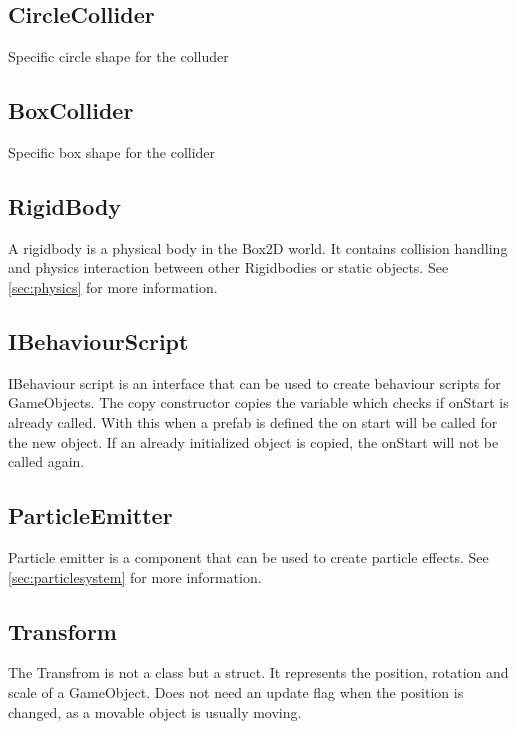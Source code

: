 \subsection{CircleCollider}
Specific circle shape for the colluder
\subsection{BoxCollider}
Specific box shape for the collider

\subsection{RigidBody}
A rigidbody is a physical body in the Box2D world. It contains collision handling and physics interaction between other Rigidbodies or static objects.
See \autoref{sec:physics} for more information.

\subsection{IBehaviourScript}
IBehaviour script is an interface that can be used to create behaviour scripts for GameObjects.
The copy constructor copies the variable which checks if onStart is already called. 
With this when a prefab is defined the on start will be called for the new object.
If an already initialized object is copied, the onStart will not be called again.

\subsection{ParticleEmitter}
Particle emitter is a component that can be used to create particle effects.
See \autoref{sec:particlesystem} for more information.

\subsection{Transform}
The Transfrom is not a class but a struct. It represents the position, rotation and scale of a GameObject.
Does not need an update flag when the position is changed, as a movable object is usually moving.


